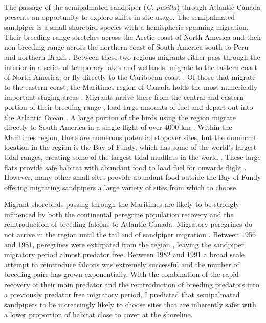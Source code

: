 The passage of the semipalmated sandpiper (\textit{C. pusilla}) through Atlantic Canada presents an opportunity to explore shifts in site usage. The semipalmated sandpiper is a small shorebird species with a hemispheric-spanning migration. Their breeding range stretches across the Arctic coast of North America and their non-breeding range across the northern coast of South America south to Peru and northern Brazil \citep{hicklin2010semipalmated}. Between these two regions migrants either pass through the interior in a series of temporary lakes and wetlands, migrate to the eastern coast of North America, or fly directly to the Caribbean coast \citep{Brown2017}. Of those that migrate to the eastern coast, the Maritimes region of Canada holds the most numerically important staging areas \citep{Hicklin87}. Migrants arrive there from the central and eastern portion of their breeding range \citep{Brown2017}, load large amounts of fuel and depart out into the Atlantic Ocean \citep{Lank1983}. A large portion of the birds using the region migrate directly to South America in a single flight of over 4000 km \citep{Lank1979,Brown2017}. Within the Maritimes region, there are numerous potential stopover sites, but the dominant location in the region is the Bay of Fundy, which has some of the world's largest tidal ranges, creating some of the largest tidal mudflats in the world \citep{garrett1972tidal}. These large flats provide safe habitat with abundant food to load fuel for onwards flight \citep{Hicklin1984,Sprague2008a,Quinn2012a}. However, many other small sites provide abundant food outside the Bay of Fundy \citep{EnvironmentCanada2009} offering migrating sandpipers a large variety of sites from which to choose.

Migrant shorebirds passing through the Maritimes are likely to be strongly influenced by both the continental peregrine population recovery and the reintroduction of breeding falcons to Atlantic Canada. Migratory peregrines do not arrive in the region until the tail end of sandpiper migration \citep{Hope2011,Worcester2008}. Between 1956 and 1981, peregrines were extirpated from the region \citep{amirault20041995}, leaving the sandpiper migratory period almost predator free. Between 1982 and 1991 a broad scale attempt to reintroduce falcons was extremely successful and the number of breeding pairs has grown exponentially. With the combination of the rapid recovery of their main predator and the reintroduction of breeding predators into a previously predator free migratory period, I predicted that semipalmated sandpipers to be increasingly likely to choose sites that are inherently safer with a lower proportion of habitat close to cover at the shoreline.

